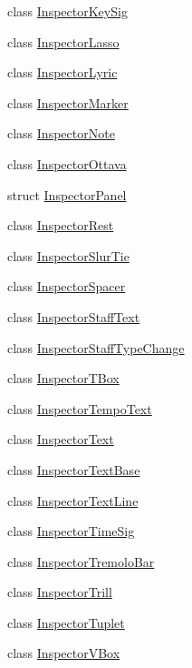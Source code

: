 \begin{DoxyCompactItemize}
\item 
class \hyperlink{class_ms_1_1_inspector_key_sig}{Inspector\+Key\+Sig}
\item 
class \hyperlink{class_ms_1_1_inspector_lasso}{Inspector\+Lasso}
\item 
class \hyperlink{class_ms_1_1_inspector_lyric}{Inspector\+Lyric}
\item 
class \hyperlink{class_ms_1_1_inspector_marker}{Inspector\+Marker}
\item 
class \hyperlink{class_ms_1_1_inspector_note}{Inspector\+Note}
\item 
class \hyperlink{class_ms_1_1_inspector_ottava}{Inspector\+Ottava}
\item 
struct \hyperlink{struct_ms_1_1_inspector_panel}{Inspector\+Panel}
\item 
class \hyperlink{class_ms_1_1_inspector_rest}{Inspector\+Rest}
\item 
class \hyperlink{class_ms_1_1_inspector_slur_tie}{Inspector\+Slur\+Tie}
\item 
class \hyperlink{class_ms_1_1_inspector_spacer}{Inspector\+Spacer}
\item 
class \hyperlink{class_ms_1_1_inspector_staff_text}{Inspector\+Staff\+Text}
\item 
class \hyperlink{class_ms_1_1_inspector_staff_type_change}{Inspector\+Staff\+Type\+Change}
\item 
class \hyperlink{class_ms_1_1_inspector_t_box}{Inspector\+T\+Box}
\item 
class \hyperlink{class_ms_1_1_inspector_tempo_text}{Inspector\+Tempo\+Text}
\item 
class \hyperlink{class_ms_1_1_inspector_text}{Inspector\+Text}
\item 
class \hyperlink{class_ms_1_1_inspector_text_base}{Inspector\+Text\+Base}
\item 
class \hyperlink{class_ms_1_1_inspector_text_line}{Inspector\+Text\+Line}
\item 
class \hyperlink{class_ms_1_1_inspector_time_sig}{Inspector\+Time\+Sig}
\item 
class \hyperlink{class_ms_1_1_inspector_tremolo_bar}{Inspector\+Tremolo\+Bar}
\item 
class \hyperlink{class_ms_1_1_inspector_trill}{Inspector\+Trill}
\item 
class \hyperlink{class_ms_1_1_inspector_tuplet}{Inspector\+Tuplet}
\item 
class \hyperlink{class_ms_1_1_inspector_v_box}{Inspector\+V\+Box}
\item 

\end{DoxyCompactItemize}
